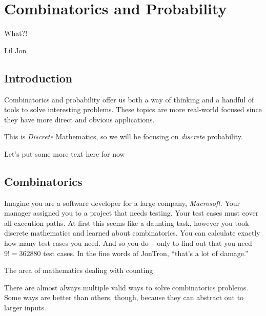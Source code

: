 \documentclass[main.tex]{subfiles}
\begin{document}
\chapter{Combinatorics and Probability}

\epigraph{What?!}{Lil Jon}

\minitoc

\section{Introduction}

Combinatorics and probability offer us both a way of thinking and a handful of tools to solve interesting problems. These topics are more real-world focused since they have more direct and obvious applications. 

This is \textit{Discrete} Mathematics, so we will be focusing on \textit{discrete} probability.

Let's put some more text here for now

\section{Combinatorics}

Imagine you are a software developer for a large company, \textit{Macrosoft}. Your manager assigned you to a project that needs testing. Your test cases must cover all execution paths. At first this seems like a daunting task, however you took discrete mathematics and learned about combinatorics. You can calculate exactly how many test cases you need. And so you do -- only to find out that you need \(9! = 362880\) test cases. In the fine words of JonTron, ``that's a lot of damage.''

\begin{defn}
	The area of mathematics dealing with counting
\end{defn}


\begin{rem}
	There are almost always multiple valid ways to solve combinatorics problems. Some ways are better than others, though, because they can abstract out to larger inputs.
\end{rem}
\end{document}
